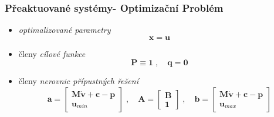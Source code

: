 \begin{frame}
	\frametitle{Přeaktuované systémy- Optimizační Problém}
	
	\begin{itemize}
	\item \emph{optimalizované parametry}
	\begin{equation*}
		\bm{x} = \bm{u}
	\end{equation*}
	\item členy \emph{cílové funkce}
	\begin{equation*}
		\bm{P} \equiv \bm{1} \;,\quad \bm{q} = \bm{0}
	\end{equation*}
	\item členy \emph{nerovnic přípustných řešení}
	\begin{equation*}
		\bm{a}
		=
		\begin{bmatrix}
			\bm{M} \bm{\dot{v}} + \bm{c} - \bm{p} \\
			\bm{u}_{min}	
		\end{bmatrix}
		\;,\quad 
		\bm{A}
		=
		\begin{bmatrix}
			\bm{B} \\
			\bm{1}
		\end{bmatrix}
		\;,\quad
		\bm{b}
		=
		\begin{bmatrix}
			\bm{M} \bm{\dot{v}} + \bm{c} - \bm{p} \\
			\bm{u}_{max}	
		\end{bmatrix}
	\end{equation*}
	\end{itemize}
\end{frame}